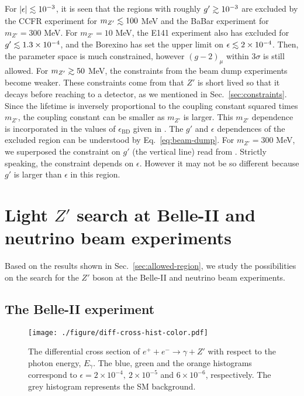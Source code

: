 \documentclass[preprint,amsmath,amssymb,superscriptaddress,nofootinbib]{revtex4}
\newcommand{\lsim}{\raise0.3ex\hbox{$\;<$\kern-0.75em\raise-1.1ex\hbox{$\sim\;$}}}
\newcommand{\gsim}{\raise0.3ex\hbox{$\;>$\kern-0.75em\raise-1.1ex\hbox{$\sim\;$}}}
\begin{document}
For $|\epsilon| \lsim 10^{-3}$, it is seen that the regions with roughly $g' \gsim 10^{-3}$ are excluded by 
the CCFR experiment for $m_{Z'} \lsim 100$ MeV and the BaBar experiment for $m_{Z'} = 300$ MeV. 
For $m_{Z'} = 10$ MeV, the E141 experiment also has excluded for 
$g' \lsim 1.3 \times 10^{-4}$, and the Borexino has set the upper limit on $\epsilon \lsim 2 \times 10^{-4}$. 
Then, the parameter space is much constrained, however $(g-2)_\mu$ within $3\sigma$ is still allowed.
For $m_{Z'} \gsim 50$ MeV, the constraints from the beam dump experiments become weaker.
These constraints come from that $Z'$ is short lived so that it decays before reaching to a detector, 
as we mentioned in Sec.~\ref{sec:constraints}. 
Since the lifetime is inversely proportional to the coupling constant squared times $m_{Z'}$, the coupling constant 
can be smaller as $m_{Z'}$ is larger. This $m_{Z'}$ dependence is incorporated in the 
values of $\epsilon_{\mathrm{BD}}$ given in \cite{Essig:2013lka} . 
The $g'$ and $\epsilon$ dependences of the excluded region can be understood by Eq.~\eqref{eq:beam-dump}.
For $m_{Z'} = 300$ MeV, we superposed the constraint on $g'$  (the vertical line) read from \cite{TheBABAR:2016rlg}. 
Strictly speaking, the constraint depends on $\epsilon$. However it may not be so different because $g'$ is larger 
than $\epsilon$ in this region.


\section{Light $Z'$ search at Belle-II and neutrino beam experiments} \label{sec:results}

Based on the results shown in Sec.~\ref{sec:allowed-region}, we study the possibilities on the search for the $Z'$ boson at 
the Belle-II and neutrino beam experiments. 


\subsection{The Belle-II experiment}

\begin{figure}[t]
\begin{center}
\texttt{[image: ./figure/diff-cross-hist-color.pdf]}
\end{center}
\caption{ 
The differential cross section of $e^+ + e^- \rightarrow \gamma + Z'$ with respect to the photon energy, 
$E_\gamma$. The blue, green and the orange histograms correspond to $\epsilon = 2 \times 10^{-4},~2 \times 10^{-5}$ 
and $6 \times 10^{-6}$, respectively. The grey histogram represents the SM background.
}
\label{fig:diff-cross-Egamma}
\end{figure}
\end{document}
